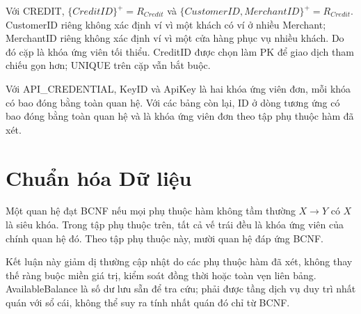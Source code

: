 Với CREDIT, $\{CreditID\}^{+}=R_{Credit}$ và $\{CustomerID,MerchantID\}^{+}=R_{Credit}$. CustomerID riêng không xác định ví vì một khách có ví ở nhiều Merchant; MerchantID riêng không xác định ví vì một cửa hàng phục vụ nhiều khách. Do đó cặp là khóa ứng viên tối thiểu. CreditID được chọn làm PK để giao dịch tham chiếu gọn hơn; UNIQUE trên cặp vẫn bắt buộc.

Với API\_CREDENTIAL, KeyID và ApiKey là hai khóa ứng viên đơn, mỗi khóa có bao đóng bằng toàn quan hệ. Với các bảng còn lại, ID ở dòng tương ứng có bao đóng bằng toàn quan hệ và là khóa ứng viên đơn theo tập phụ thuộc hàm đã xét.

\section{Chuẩn hóa Dữ liệu}
Một quan hệ đạt BCNF nếu mọi phụ thuộc hàm không tầm thường $X \rightarrow Y$ có $X$ là siêu khóa. Trong tập phụ thuộc trên, tất cả vế trái đều là khóa ứng viên của chính quan hệ đó. Theo tập phụ thuộc này, mười quan hệ đáp ứng BCNF.

Kết luận này giảm dị thường cập nhật do các phụ thuộc hàm đã xét, không thay thế ràng buộc miền giá trị, kiểm soát đồng thời hoặc toàn vẹn liên bảng. AvailableBalance là số dư lưu sẵn để tra cứu; phải được tầng dịch vụ duy trì nhất quán với sổ cái, không thể suy ra tính nhất quán đó chỉ từ BCNF.
